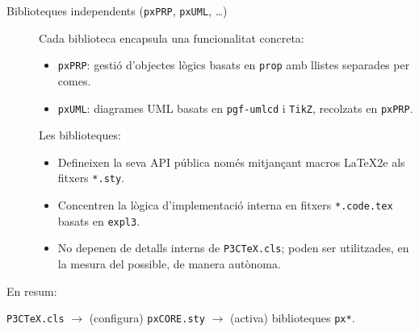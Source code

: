 \documentclass[EN]{P3CTeX}
\begin{document}
\begin{description}
  \item[Biblioteques independents (\texttt{pxPRP}, \texttt{pxUML}, \dots)]
    Cada biblioteca encapsula una funcionalitat concreta:
    \begin{itemize}
      \item \texttt{pxPRP}: gestió d'objectes lògics basats en
            \texttt{prop} amb llistes separades per comes.
      \item \texttt{pxUML}: diagrames UML basats en \texttt{pgf-umlcd}
            i \texttt{TikZ}, recolzats en \texttt{pxPRP}.
    \end{itemize}
    Les biblioteques:
    \begin{itemize}
      \item Defineixen la seva API pública només mitjançant macros
            \LaTeX2e als fitxers \texttt{*.sty}.
      \item Concentren la lògica d'implementació interna en fitxers
            \texttt{*.code.tex} basats en \texttt{expl3}.
      \item No depenen de detalls interns de \texttt{P3CTeX.cls};
            poden ser utilitzades, en la mesura del possible, de
            manera autònoma.
    \end{itemize}
\end{description}

\bigskip

En resum:
\begin{center}
  \texttt{P3CTeX.cls} $\rightarrow$ (configura) \texttt{pxCORE.sty}
  $\rightarrow$ (activa) biblioteques \texttt{px*}.
\end{center}
\end{document}
